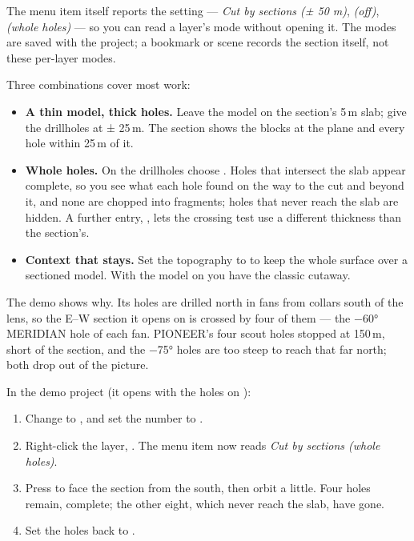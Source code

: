 The menu item itself reports the setting — \emph{Cut by sections (± 50 m)}, \emph{(off)}, \emph{(whole holes)} — so you can read a layer's mode without opening it. The modes are saved with the project; a bookmark or scene records the section itself, not these per-layer modes.

Three combinations cover most work:

\begin{itemize}
\item \textbf{A thin model, thick holes.} Leave the model on the section's 5\,m slab; give the drillholes  at ± 25\,m. The section shows the blocks at the plane and every hole within 25\,m of it.
\item \textbf{Whole holes.} On the drillholes choose . Holes that intersect the slab appear complete, so you see what each hole found on the way to the cut and beyond it, and none are chopped into fragments; holes that never reach the slab are hidden. A further entry, , lets the crossing test use a different thickness than the section's.
\item \textbf{Context that stays.} Set the topography to  to keep the whole surface over a sectioned model. With the model on  you have the classic cutaway.
\end{itemize}

The demo shows why. Its holes are drilled north in fans from collars south of the lens, so the E–W section it opens on is crossed by four of them — the −60° MERIDIAN hole of each fan. PIONEER's four scout holes stopped at 150\,m, short of the section, and the −75° holes are too steep to reach that far north; both drop out of the picture.


\begin{tryit}
In the demo project (it opens with the holes on ):
\begin{enumerate}
\item Change  to , and set the number to .
\item Right-click the  layer, . The menu item now reads \emph{Cut by sections (whole holes)}.
\item Press  to face the section from the south, then orbit a little. Four holes remain, complete; the other eight, which never reach the slab, have gone.
\item Set the holes back to .
\end{enumerate}
\end{tryit}

